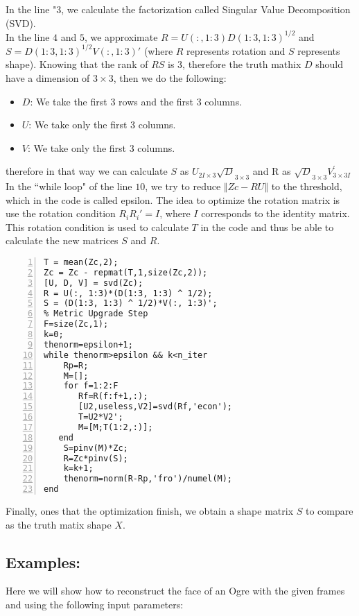 \noindent In the line "$3$, we calculate the factorization called Singular Value Decomposition (SVD).\\
\noindent In the line $4$ and $5$, we approximate $R=U(:,1:3)D(1:3, 1:3)^{1/2}$ and $S=D(1:3, 1:3)^{1/2}V(:, 1:3)'$ (where $R$ represents rotation and $S$ represents shape). Knowing that the rank of $RS$ is 3, therefore the truth mathix $D$ should have a dimension of $3\times 3$, then we do the following:\\
\begin{itemize}
\item $D$: We take the first 3 rows and the first 3 columns.
\item $U$: We take only the first 3 columns.
\item $V$: We take only the first 3 columns.
\end{itemize}
\noindent therefore in that way we can calculate $S$ as $U_{2I\times 3}\sqrt{D}_{3\times 3}$ and R as $\sqrt{D}_{3\times 3}V^{'}_{3\times 3I}$\\

\noindent In the ``while loop" of the line $10$, we try to reduce $\Vert Zc-RU\Vert$  to the threshold, which in the code is called epsilon. The idea to optimize the rotation matrix is use the rotation condition $R_{i}R_{i}'=I$, where $I$ corresponds to the identity matrix. This rotation condition is used to calculate $T$ in the code and thus be able to calculate the new matrices $S$ and $R$.

\begin{lstlisting}[style=Matlab-editor, numbers=left,label={lst:codeT1},captionpos=b, caption={Factorization code for orthographic camera}]
T = mean(Zc,2);
Zc = Zc - repmat(T,1,size(Zc,2)); 
[U, D, V] = svd(Zc);
R = U(:, 1:3)*(D(1:3, 1:3) ^ 1/2); 
S = (D(1:3, 1:3) ^ 1/2)*V(:, 1:3)';
% Metric Upgrade Step
F=size(Zc,1);
k=0;
thenorm=epsilon+1;
while thenorm>epsilon && k<n_iter
    Rp=R;
    M=[];
    for f=1:2:F
       Rf=R(f:f+1,:);
       [U2,useless,V2]=svd(Rf,'econ');       
       T=U2*V2';
       M=[M;T(1:2,:)];
   end 
    S=pinv(M)*Zc;
    R=Zc*pinv(S);
    k=k+1;
    thenorm=norm(R-Rp,'fro')/numel(M);
end
\end{lstlisting}
\noindent Finally, ones that the optimization finish, we obtain a shape matrix $S$ to compare as the truth matix shape $X$.

\subsection{Examples:}
\noindent Here we will show how to reconstruct the face of an Ogre with the given frames and using the following input parameters:

